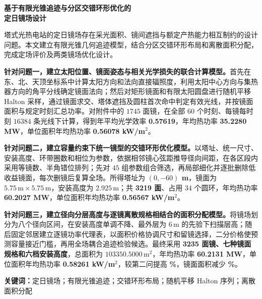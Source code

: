 \documentclass[UTF8,a4paper,zihao=-4,fontset=mac]{ctexart}
\begin{document}
\hypersetup{pageanchor=false}
\thispagestyle{empty}
\begin{center}
{\bfseries 基于有限光锥追迹与分区交错环形优化的\\定日镜场设计}\par
\vspace{4mm}{\large\bfseries 摘\quad 要}
\end{center}
塔式光热电站的定日镜场存在采光面积、镜间遮挡与额定产热能力相互制约的设计问题。本文建立有限光锥几何追迹模型，结合分区交错环形布局和离散面积分配，完成定场评价及两类镜场优化设计。

\textbf{针对问题一，建立太阳位置、镜面姿态与相关光学损失的联合计算模型。}首先在东、北、天顶坐标系中计算太阳方向和法向直接辐照度，利用太阳中心方向与集热器方向的角平分线确定镜面法向；然后对矩形镜面和有限太阳圆盘进行随机平移 Halton 采样，通过镜面求交、塔体遮挡及圆柱首次命中判定有效光线，并按镜面面积与规定时刻汇总功率。对附件中的 $1745$ 面镜，在全部 $60$ 个时刻、每镜每时刻 $16384$ 条光线下计算，得到年平均光学效率 \textbf{0.57619}，年均热功率 \textbf{35.2280 MW}，单位面积年均热功率 \textbf{0.56078 kW/m$^2$}。

\textbf{针对问题二，建立容量约束下统一镜型的交错环形优化模型。}以塔址、统一尺寸、安装高度、环带圈数和相位为参数，依据相邻镜心弦距推导径向间距，在各区段内采用等镜数、半角错位排列；先对 $45$ 组参数组合筛选，再局部细化并逐批删除低收益镜面，每次删镜后复算全场。所得塔址为 \textbf{$(0,-60)$ m}，镜面为 $5.75\,\mathrm m\times5.75\,\mathrm m$，安装高度为 $2.925\,\mathrm m$；共 \textbf{3219 面}、占用 $34$ 个圆环，年均热功率 \textbf{60.2027 MW}，单位面积年均热功率 \textbf{0.56567 kW/m$^2$}。

\textbf{针对问题三，建立径向分层高度与逐镜离散规格相结合的面积分配模型。}将镜场划分为八个径向区间，在安装高度单调不降、最外层为 $6\,\mathrm m$ 的先验下扫描层高；随后固定邻居建立逐镜功率代理表，以面积价格协调尺寸和留镜选择，二分价格使预测容量接近门槛，再用全场耦合追迹检验候选。最终采用 \textbf{3235 面镜、七种镜面规格和六档安装高度}，总面积为 $103350.5000\,\mathrm m^2$，年均热功率 \textbf{60.2131 MW}，单位面积年均热功率 \textbf{0.58261 kW/m$^2$}，较第二问提高 \textbf{\Gain\%}，镜面面积减少 \textbf{\Saving\%}。

\vspace{3mm}
\noindent\textbf{关键词：}定日镜场；有限光锥追迹；交错环形布局；随机平移 Halton 序列；离散面积分配
\clearpage
\setcounter{page}{1}
\hypersetup{pageanchor=true}





\label{main-end}
\clearpage
\appendix

\end{document}
